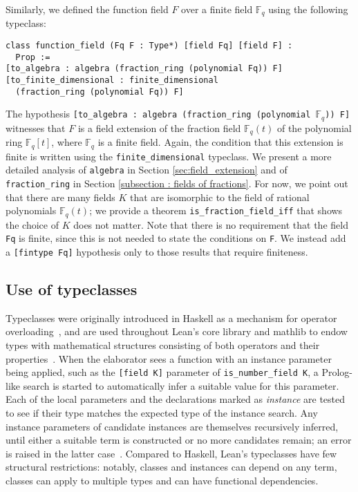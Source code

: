 \documentclass[sn-mathphys]{sn-jnl}%
\newcommand{\lean}[1]{\texttt{#1}\xspace}
\newcommand*{\Fq}[1][q]{\mathbb{F}_{#1}}
\newcommand{\mathlib}{\textsf{mathlib}\xspace}
\begin{document}
Similarly, we defined the function field $F$ over a finite field $\Fq$ using the following typeclass:
\begin{lstlisting}
class function_field (Fq F : Type*) [field Fq] [field F] :
  Prop :=
[to_algebra : algebra (fraction_ring (polynomial Fq)) F]
[to_finite_dimensional : finite_dimensional
  (fraction_ring (polynomial Fq)) F]
\end{lstlisting}
The hypothesis \lean{[to\_algebra : algebra (fraction\_ring (polynomial $\Fq$)) F]} witnesses that $F$ is a field extension of the fraction field $\Fq[q](t)$ of the polynomial ring $\Fq[q][t]$, where $\Fq[q]$ is a finite field.
Again, the condition that this extension is finite is written using the \lean{finite\_dimensional} typeclass.
We present a more detailed analysis of \lean{algebra} in Section \ref{sec:field_extension} and of \lean{fraction\_ring} in Section \ref{subsection : fields of fractions}.
For now, we point out that there are many fields $K$ that are isomorphic to the field of rational polynomials $\Fq[q](t)$; we provide a theorem \lean{is\_fraction\_field\_iff} that shows the choice of $K$ does not matter.
Note that there is no requirement that the field \lean{Fq} is finite, since this is not needed to state the conditions on \lean{F}.
We instead add a \lean{[fintype Fq]} hypothesis only to those results that require finiteness.

\subsection{Use of typeclasses} \label{sec:typeclasses}
Typeclasses were originally introduced in Haskell as a mechanism for operator overloading~\cite{typeclasses-haskell},
and are used throughout Lean's core library and \mathlib to endow types with mathematical structures consisting of both operators and their properties~\cite{mathlib}.
When the elaborator sees a function with an instance parameter being applied, such as the \lean{[field K]} parameter of \lean{is\_number\_field K}, a Prolog-like search is started to automatically infer a suitable value for this parameter.
Each of the local parameters and the declarations marked as \emph{instance} are tested to see if their type matches the expected type of the instance search.
Any instance parameters of candidate instances are themselves recursively inferred, until either a suitable term is constructed or no more candidates remain; an error is raised in the latter case~\cite[\S 10]{theorem-proving-in-lean}.
Compared to Haskell, Lean's typeclasses have few structural restrictions: notably, classes and instances can depend on any term, classes can apply to multiple types and can have functional dependencies.
\end{document}
